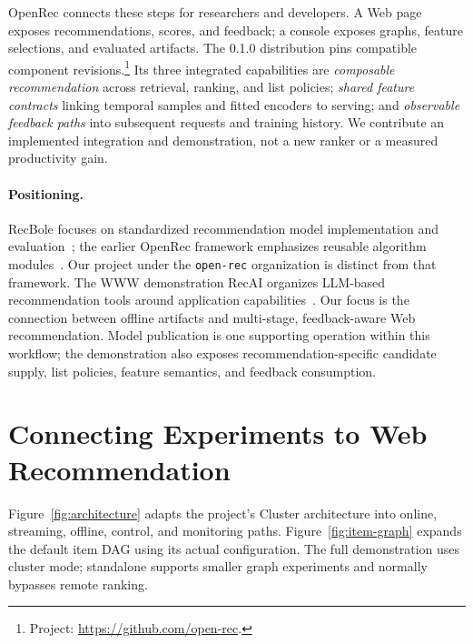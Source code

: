 \documentclass[sigconf,screen,review]{acmart}
\begin{document}
OpenRec connects these steps for researchers and developers. A Web page exposes recommendations, scores, and feedback; a console exposes graphs, feature selections, and evaluated artifacts. The 0.1.0 distribution pins compatible component revisions.\footnote{Project: \url{https://github.com/open-rec}.} Its three integrated capabilities are \emph{composable recommendation} across retrieval, ranking, and list policies; \emph{shared feature contracts} linking temporal samples and fitted encoders to serving; and \emph{observable feedback paths} into subsequent requests and training history. We contribute an implemented integration and demonstration, not a new ranker or a measured productivity gain.

\paragraph{Positioning.}
RecBole focuses on standardized recommendation model implementation and evaluation~\cite{recbole}; the earlier OpenRec framework emphasizes reusable algorithm modules~\cite{openrec2018}. Our project under the \texttt{open-rec} organization is distinct from that framework. The WWW demonstration RecAI organizes LLM-based recommendation tools around application capabilities~\cite{recai}. Our focus is the connection between offline artifacts and multi-stage, feedback-aware Web recommendation. Model publication is one supporting operation within this workflow; the demonstration also exposes recommendation-specific candidate supply, list policies, feature semantics, and feedback consumption.

\section{Connecting Experiments to Web Recommendation}
Figure~\ref{fig:architecture} adapts the project's Cluster architecture into online, streaming, offline, control, and monitoring paths. Figure~\ref{fig:item-graph} expands the default item DAG using its actual configuration. The full demonstration uses cluster mode; standalone supports smaller graph experiments and normally bypasses remote ranking.
\end{document}
